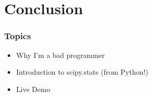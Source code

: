 \documentclass{beamer}
\begin{document}
\section{Conclusion}
\begin{frame}


\frametitle{Topics}

\begin{itemize}

    \item Why I'm a bad programmer
    \item Introduction to scipy.stats (from Python!)
    \item Live Demo

\end{itemize}

\end{frame}
\end{document}
